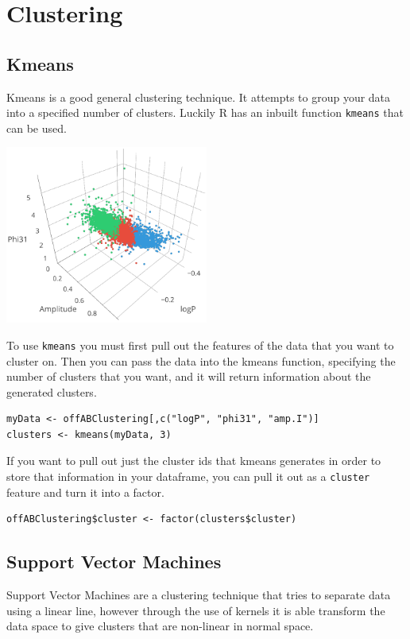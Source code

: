 \chapter{Clustering}

\section{Kmeans}
Kmeans is a good general clustering technique. It attempts to group your data into a specified number of clusters. Luckily R has an inbuilt function \verb|kmeans| that can be used.

\begin{center}
	\includegraphics[width=0.5\textwidth]{images/kmeans_01.png}
\end{center}

To use \verb|kmeans| you must first pull out the features of the data that you want to cluster on. Then you can pass the data into the kmeans function, specifying the number of clusters that you want, and it will return information about the generated clusters.

\begin{verbatim}
myData <- offABClustering[,c("logP", "phi31", "amp.I")]
clusters <- kmeans(myData, 3)
\end{verbatim}

If you want to pull out just the cluster ids that kmeans generates in order to store that information in your dataframe, you can pull it out as a \verb|cluster| feature and turn it into a factor.

\begin{verbatim}
offABClustering$cluster <- factor(clusters$cluster)
\end{verbatim}

\section{Support Vector Machines}
Support Vector Machines are a clustering technique that tries to separate data using a linear line, however through the use of kernels it is able transform the data space to give clusters that are non-linear in normal space.

